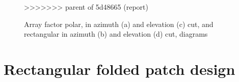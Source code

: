 \documentclass[12pt,a4paper]{article}
\begin{document}
{\begin{center}
\begin{figure}[h]
			\hfill
	\begin{subfigure}{0.5\linewidth}
		\def\svgwidth{\linewidth}
		\tiny{}
		\caption{}
			\end{subfigure}
			\hfill
	\begin{subfigure}{0.4\linewidth}
		\def\svgwidth{\linewidth}
		\tiny{}
	\caption{}
	\end{subfigure}
			\hfill
	\begin{subfigure}{0.5\linewidth}
	\def\svgwidth{\linewidth}
\tiny{}
	\caption{}
\end{subfigure}
	\hfill
\caption{{Array factor polar, in azimuth (a) and elevation (c) cut, and rectangular  in azimuth (b) and elevation (d) cut, diagrams}}
>>>>>>> parent of 5d48665 (report)
\label{fig:array factor}
\end{figure}
\end{center}

\newpage
\section*{Rectangular folded patch design}

}
\end{document}
